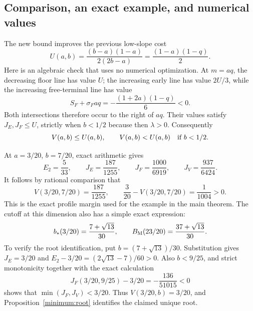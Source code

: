 \subsection{Comparison, an exact example, and numerical values}
The new bound improves the previous low-slope cost
\[
 U(a,b)=\frac{(b-a)(1-a)}{2(2b-a)}
       =\frac{(1-a)(1-q)}2.
\]
Here is an algebraic check that uses no numerical optimization. At
\(m=aq\), the decreasing floor line has value \(U\); the increasing
early line has value \(2U/3\), while the increasing free-terminal line
has value
\[
 S_F+\sigma_F aq=-\frac{(1+2a)(1-q)}6<0.
\]
Both intersections therefore occur to the right of \(aq\). Their
values satisfy \(J_E,J_F\le U\), strictly when \(b<1/2\) because
then \(\lambda>0\). Consequently
\begin{equation}\label{minimum:old-comparison}
 V(a,b)\le U(a,b),
 \qquad V(a,b)<U(a,b)\quad\hbox{if }b<1/2.
\end{equation}

At \(a=3/20\), \(b=7/20\), exact arithmetic gives
\[
 E_2=\frac5{33},\qquad J_E=\frac{187}{1255},\qquad
 J_F=\frac{1000}{6919},\qquad J_V=\frac{937}{6424}.
\]
It follows by rational comparison that
\[
 V(3/20,7/20)=\frac{187}{1255},\qquad
 \frac3{20}-V(3/20,7/20)=\frac1{1004}>0.
\]
This is the exact profile margin used for the example in the main theorem.
The cutoff at this dimension also has a simple exact expression:
\begin{equation}\label{minimum:exact-cutoff}
 b_*(3/20)=\frac{7+\sqrt{13}}{30},\qquad
 B_{\rm M}(23/20)=\frac{37+\sqrt{13}}{30}.
\end{equation}
To verify the root identification, put \(b=(7+\sqrt{13})/30\).
Substitution gives \(J_E=3/20\) and
\(E_2-3/20=(2\sqrt{13}-7)/60>0\). Also \(b<9/25\), and
strict monotonicity together with the exact calculation
\[
 J_F(3/20,9/25)-3/20=-\frac{136}{51015}<0
\]
shows that \(\min(J_F,J_V)<3/20\). Thus
\(V(3/20,b)=3/20\), and Proposition~\ref{minimum:root} identifies
the claimed unique root.

